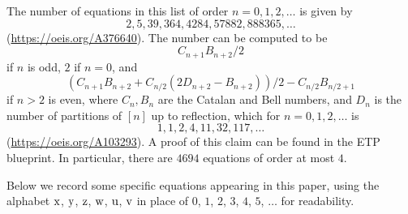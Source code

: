 The number of equations in this list of order $n=0,1,2,\dots$ is given by
$$ 2, 5, 39, 364, 4284, 57882, 888365, \dots$$
(\url{https://oeis.org/A376640}).  The number can be computed to be
$$ C_{n+1} B_{n+2}/2$$
if $n$ is odd, $2$ if $n=0$, and
$$ (C_{n+1} B_{n+2}+ C_{n/2}(2D_{n+2}-B_{n+2}))/2 - C_{n/2} B_{n/2+1}$$
if $n > 2$ is even, where $C_n, B_n$ are the Catalan and Bell numbers, and $D_n$ is the number of partitions of $[n]$ up to reflection, which for $n=0,1,2,\dots$ is
$$ 1, 1, 2, 4, 11, 32, 117, \dots$$
(\url{https://oeis.org/A103293}).  A proof of this claim can be found in the ETP blueprint.  In particular, there are $4694$ equations of order at most $4$.

Below we record some specific equations appearing in this paper, using the alphabet $\mathrm{x}$, $\mathrm{y}$, $\mathrm{z}$, $\mathrm{w}$, $\mathrm{u}$, $\mathrm{v}$ in place of $0$, $1$, $2$, $3$, $4$, $5$, $\dots$ for readability.
